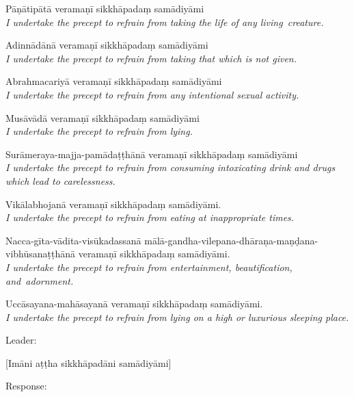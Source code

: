 {\raggedright

\begin{packedenumerate}
  \item Pāṇātipātā veramaṇī sikkhāpadaṃ samādiyāmi\\
  \emph{I undertake the precept to refrain from taking the life of any living~creature.}
  \item Adinnādānā veramaṇī sikkhāpadaṃ samādiyāmi\\
  \emph{I undertake the precept to refrain from taking that which is not given.}
  \item Abrahmacariyā veramaṇī sikkhāpadaṃ samādiyāmi\\
  \emph{I undertake the precept to refrain from any intentional sexual activity.}
  \item Musāvādā veramaṇī sikkhāpadaṃ samādiyāmi\\
  \emph{I undertake the precept to refrain from lying.}
  \item Surāmeraya-majja-pamādaṭṭhānā veramaṇī sikkhāpadaṃ samādiyāmi\\
  \emph{I undertake the precept to refrain from consuming intoxicating drink and drugs which lead to carelessness.}
  \item Vikālabhojanā veramaṇī sikkhāpadaṃ samādiyāmi.\\
  \emph{I undertake the precept to refrain from eating at inappropriate times.}
  \item Nacca-gīta-vādita-visūkadassanā mālā-gandha-vilepana-dhāraṇa-maṇḍana-vibhūsanaṭṭhānā veramaṇī sikkhāpadaṃ samādiyāmi.\\
  \emph{I undertake the precept to refrain from entertainment, beautification, and~adornment.}
  \item Uccāsayana-mahāsayanā veramaṇī sikkhāpadaṃ samādiyāmi.\\
  \emph{I undertake the precept to refrain from lying on a high or luxurious sleeping place.}
\end{packedenumerate}

}


\ifhandbookedition
\clearpage
\fi

\begin{instruction}
  Leader:
\end{instruction}

[Imāni aṭṭha sikkhāpadāni samādiyāmi]

\begin{instruction}
  Response:
\end{instruction}

